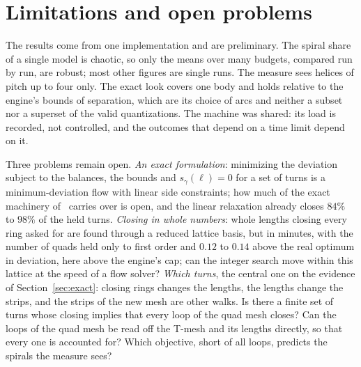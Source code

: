 \documentclass[11pt,a4paper]{article}
\newcommand{\shift}{s}
\begin{document}
\section{Limitations and open problems}\label{sec:limits}

The results come from one implementation and are preliminary. The spiral
share of a single model is chaotic, so only the means over many budgets,
compared run by run, are robust; most other figures are single runs. The measure sees helices of pitch
up to four only. The exact look covers one body and holds relative to the
engine's bounds of separation, which are its choice of arcs and neither a
subset nor a superset of the valid quantizations. The machine was shared:
its load is recorded, not controlled, and the outcomes that depend on a
time limit depend on it.

Three problems remain open. \emph{An exact formulation}: minimizing the
deviation subject to the balances, the bounds and $\shift_\gamma(\ell) = 0$
for a set of turns is a minimum-deviation flow with linear side constraints;
how much of the exact machinery of~\cite{heistermann2023bimdf} carries over is
open, and the linear relaxation already closes $84\%$ to $98\%$ of the held
turns.
\emph{Closing in whole numbers}: whole lengths closing every ring asked for
are found through a reduced lattice basis, but in minutes, with the number
of quads held only to first order and $0.12$ to $0.14$ above the real optimum
in deviation, here above the engine's cap; can the integer search move within this lattice at the speed of
a flow solver? \emph{Which turns}, the central one on the evidence of
Section~\ref{sec:exact}: closing rings changes the lengths, the lengths
change the strips, and the strips of the new mesh are other walks. Is there a
finite set of turns whose closing implies that every loop of the quad mesh
closes? Can the loops of the quad mesh be read off the T-mesh and its lengths
directly, so that every one is accounted for? Which objective, short of all
loops, predicts the spirals the measure sees?
\end{document}
